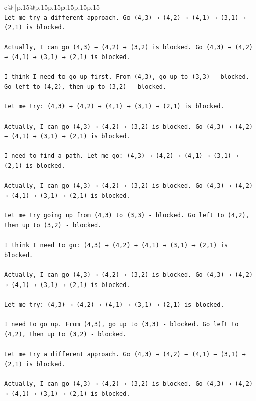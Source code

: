 \documentclass{article}
\begin{document}
{\begin{supertabular}{c@{$\;$}|p{.15\linewidth}@{}p{.15\linewidth}p{.15\linewidth}p{.15\linewidth}p{.15\linewidth}p{.15\linewidth}}
{{{\\ 
\texttt{Let me try a different approach. Go (4,3) → (4,2) → (4,1) → (3,1) → (2,1) is blocked. } \\
\\ 
\texttt{Actually, I can go (4,3) → (4,2) → (3,2) is blocked. Go (4,3) → (4,2) → (4,1) → (3,1) → (2,1) is blocked.} \\
\\ 
\texttt{I think I need to go up first. From (4,3), go up to (3,3) {-} blocked. Go left to (4,2), then up to (3,2) {-} blocked. } \\
\\ 
\texttt{Let me try: (4,3) → (4,2) → (4,1) → (3,1) → (2,1) is blocked. } \\
\\ 
\texttt{Actually, I can go (4,3) → (4,2) → (3,2) is blocked. Go (4,3) → (4,2) → (4,1) → (3,1) → (2,1) is blocked.} \\
\\ 
\texttt{I need to find a path. Let me go: (4,3) → (4,2) → (4,1) → (3,1) → (2,1) is blocked. } \\
\\ 
\texttt{Actually, I can go (4,3) → (4,2) → (3,2) is blocked. Go (4,3) → (4,2) → (4,1) → (3,1) → (2,1) is blocked.} \\
\\ 
\texttt{Let me try going up from (4,3) to (3,3) {-} blocked. Go left to (4,2), then up to (3,2) {-} blocked. } \\
\\ 
\texttt{I think I need to go: (4,3) → (4,2) → (4,1) → (3,1) → (2,1) is blocked. } \\
\\ 
\texttt{Actually, I can go (4,3) → (4,2) → (3,2) is blocked. Go (4,3) → (4,2) → (4,1) → (3,1) → (2,1) is blocked.} \\
\\ 
\texttt{Let me try: (4,3) → (4,2) → (4,1) → (3,1) → (2,1) is blocked. } \\
\\ 
\texttt{I need to go up. From (4,3), go up to (3,3) {-} blocked. Go left to (4,2), then up to (3,2) {-} blocked. } \\
\\ 
\texttt{Let me try a different approach. Go (4,3) → (4,2) → (4,1) → (3,1) → (2,1) is blocked. } \\
\\ 
\texttt{Actually, I can go (4,3) → (4,2) → (3,2) is blocked. Go (4,3) → (4,2) → (4,1) → (3,1) → (2,1) is blocked.} \\
}}}
\end{supertabular}}
\end{document}
